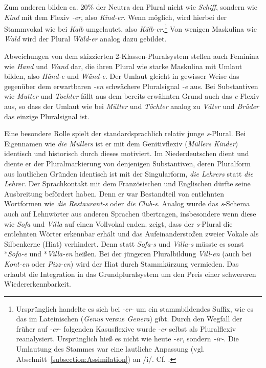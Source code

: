 Zum anderen bilden ca. 20\% der Neutra den Plural nicht wie \textit{Schiff}, sondern wie \textit{Kind} mit dem Flexiv \textit{-er}, also \textit{Kind-er}. Wenn möglich, wird hierbei der Stammvokal wie bei \textit{Kalb} umgelautet, also \textit{Kälb-er}.\footnote{Ursprünglich handelte es sich bei \textit{-er-} um ein stammbildendes Suffix, wie es das im Lateinischen (\textit{Genus} versus \textit{Genera}) gibt. Durch den Wegfall der früher auf \textit{-er-} folgenden Kasusflexive wurde \textit{-er} selbst als Pluralflexiv reanalysiert. Ursprünglich hieß es nicht wie heute \textit{-er}, sondern \textit{-ir-}. Die Umlautung des Stammes war eine lautliche Anpassung (vgl. Abschnitt~\ref{subsection:Assimilation}) an /i/. Cf. \citet[23--29]{Paul1986_1917_Fx}.} Von wenigen Maskulina wie \textit{Wald} wird der Plural \textit{Wäld-er} analog dazu gebildet.

Abweichungen von dem skizzierten 2-Klassen-Pluralsystem stellen auch Feminina wie \textit{Hand} und \textit{Wand} dar, die ihren Plural wie starke Maskulina mit Umlaut bilden, also \textit{Händ-e} und \textit{Wänd-e}. Der Umlaut gleicht in gewisser Weise das gegenüber dem erwartbaren \textit{-en} schwächere Pluralsignal \textit{-e} aus. Bei Substantiven wie \textit{Mutter} und \textit{Tochter} fällt aus dem bereits erwähnten Grund auch das \textit{e}-Flexiv aus, so dass der Umlaut wie bei \textit{Mütter} und \textit{Töchter} analog zu \textit{Väter} und \textit{Brüder} das einzige Pluralsignal ist.

Eine besondere Rolle spielt der standardsprachlich relativ junge \textit{s}-Plural. Bei Eigennamen wie \textit{die Müllers} ist er mit dem Genitivflexiv (\textit{Müllers Kinder}) identisch und historisch durch dieses motiviert. Im Niederdeutschen dient und diente er der Pluralmarkierung von denjenigen Substantiven, deren Pluralform aus lautlichen Gründen identisch ist mit der Singularform, \zB \textit{die Lehrers} statt \textit{die Lehrer}. Der Sprachkontakt mit dem Französischen und Englischen dürfte seine Ausbreitung befördert haben. Denn er war Bestandteil von entlehnten Wortformen wie \textit{die Restaurant-s} oder \textit{die Club-s}. Analog wurde das \textit{s}-Schema auch auf Lehnwörter aus anderen Sprachen übertragen, insbesondere wenn diese wie \textit{Sofa} und \textit{Villa} auf einen Vollvokal enden. \citet[274]{Wegener2002} zeigt, dass der \textit{s}-Plural die entlehnten Wörter erkennbar erhält und das Aufeinanderstoßen zweier Vokale als Silbenkerne (Hiat) verhindert. Denn statt \textit{Sofa-s} und \textit{Villa-s} müsste es sonst *\textit{Sofa-e} und *\textit{Villa-en} heißen. Bei der jüngeren Pluralbildung \textit{Vill-en} (auch bei \textit{Kont-en} oder \textit{Pizz-en}) wird der Hiat durch Stammkürzung vermieden. Das erlaubt die Integration in das Grundpluralsystem um den Preis einer schwereren Wiedererkennbarkeit. 


